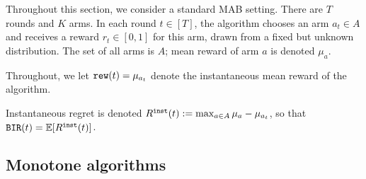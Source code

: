 
\newcommand{\ExplorExploit}{\term{ExplorExploit}}
\newcommand{\PhasedExplorExploit}{\term{PhasedExplorExploit}}
\newcommand{\SuccesiveEliminationReset}{\term{SuccesiveEliminationReset}}

\newcommand{\IReg}{R^{\term{inst}}} %





Throughout this section, we consider a standard MAB setting. There are $T$ rounds and $K$ arms. In each round $t\in [T]$, the algorithm chooses an arm $a_t\in A$ and receives a reward $r_t\in[0,1]$ for this arm, drawn from a fixed but unknown distribution. The set of all arms is $A$; mean reward of arm $a$ is denoted $\mu_a$.

Throughout, we let
    $\mathtt{rew}(t) = \mu_{a_t}$
denote the instantaneous mean reward of the algorithm.

Instantaneous regret is denoted
    $\IReg(t) := \max_{a\in A} \mu_a - \mu_{a_t}$,
so that
    $\BIR(t) = \E[\IReg(t)]$.

\subsection{Monotone algorithms}
\label{app:MAB-mono}




